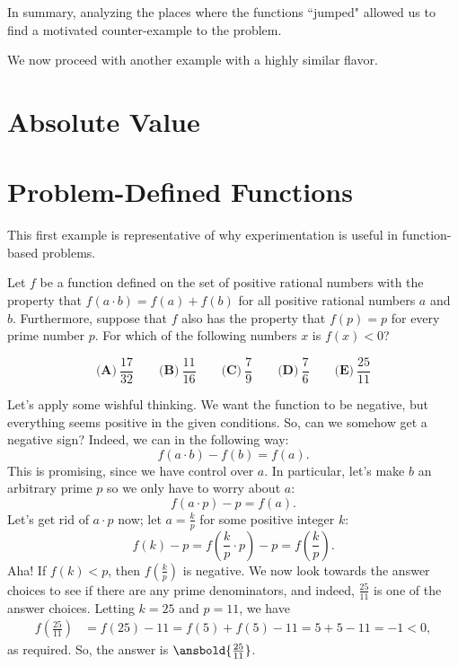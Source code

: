 \documentclass{article}
\begin{document}
\bigskip

In summary, analyzing the places where the functions ``jumped" allowed us to find a motivated counter-example to the problem.  

We now proceed with another example with a highly similar flavor.

\section{Absolute Value}

\section{Problem-Defined Functions}

This first example is representative of why experimentation is useful in function-based problems. 

\begin{exam}[2021 AMC 10A/18]
Let $f$ be a function defined on the set of positive rational numbers with the property that $f(a\cdot b)=f(a)+f(b)$ for all positive rational numbers $a$ and $b$. Furthermore, suppose that $f$ also has the property that $f(p)=p$ for every prime number $p$. For which of the following numbers $x$ is $f(x)<0$?

$$\textbf{(A)} ~\frac{17}{32}\qquad\textbf{(B)} ~\frac{11}{16}\qquad\textbf{(C)} ~\frac{7}{9}\qquad\textbf{(D)} ~\frac{7}{6} \qquad\textbf{(E)} ~\frac{25}{11}$$
\end{exam}

\begin{sol}
Let's apply some wishful thinking. We want the function to be negative, but everything seems positive in the given conditions. So, can we somehow get a negative sign? Indeed, we can in the following way:
 \[ f(a \cdot b) - f(b) = f(a). \]
This is promising, since we have control over $a$. In particular, let's make $b$ an arbitrary prime $p$ so we only have to worry about $a$:
 \[ f(a \cdot p) - p = f(a). \]
Let's get rid of $a \cdot p$ now; let $a = \frac{k}{p}$ for some positive integer $k$:
 \[ f(k) - p = f\left( \frac{k}{p}\cdot p\right) - p = f\left(\frac{k}{p}\right). \]
Aha! If $f(k) < p$, then $f\left(\frac{k}{p}\right)$ is negative. We now look towards the answer choices to see if there are any prime denominators, and indeed, $\frac{25}{11}$ is one of the answer choices. Letting $k = 25$ and $p = 11$, we have
\begin{align*}
f\left(\frac{25}{11}\right) &= f(25) - 11 = f(5) + f(5) - 11 = 5 + 5 - 11 = -1 < 0,
\end{align*}
as required. So, the answer is $\ansbold{\frac{25}{11}}$.
\end{sol}
\end{document}
